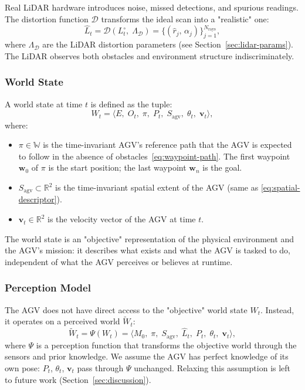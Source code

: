 \documentclass[conference]{IEEEtran}
\begin{document}
Real LiDAR hardware introduces noise, missed detections, and spurious readings. The distortion function $\mathcal{D}$ transforms the ideal scan into a "realistic" one:
\begin{equation}
\label{eq:distorted-scan}
     \hat{L}_t = \mathcal{D}(L_t^{\circ},\; \Lambda_{\mathcal{D}})
    = \{(\hat{r}_j,\, \alpha_j)\}_{j=1}^{N_{\text{rays}}},
\end{equation}
where $\Lambda_{\mathcal{D}}$ are the LiDAR distortion parameters (see Section~\ref{sec:lidar-params}). The LiDAR observes both obstacles and environment structure indiscriminately.
 
\subsubsection{World State}
\label{sec:world-state}
A world state at time $t$ is defined as the tuple:
\begin{equation}
\label{eq:world-state}
    W_t = \langle E,\; O_t,\; \pi,\;  P_t,\; S_{\text{agv}},\; \theta_t,\; \mathbf{v}_t \rangle,
\end{equation}
where:
\begin{itemize}
    \item $\pi \in \mathbb{W}$ is the time-invariant AGV's reference path that the AGV is expected to follow in the absence of obstacles~\eqref{eq:waypoint-path}. The first waypoint $\mathbf{w}_0$ of $\pi$ is the start position; the last waypoint $\mathbf{w}_n$ is the goal.
    \item $S_{\text{agv}} \subset \mathbb{R}^2$ is the time-invariant spatial extent of the AGV (same as \eqref{eq:spatial-descriptor}).
    \item $\mathbf{v}_t \in \mathbb{R}^2$ is the velocity vector of the AGV at time $t$.
\end{itemize}
The world state is an "objective" representation of the physical environment and the AGV's mission: it describes what exists and what the AGV is tasked to do, independent of what the AGV perceives or believes at runtime.
  
  
\subsubsection{Perception Model}
\label{sec:perception-model}
The AGV does not have direct access to the "objective" world state $W_t$. Instead, it operates on a perceived world $\tilde{W}_t$:
\begin{equation}
\label{eq:perception-function}
    \tilde{W}_t = \Psi(W_t)
    = \langle M_0,\; \pi,\; S_{\text{agv}},\; \hat{L}_t,\; P_t,\; \theta_t,\; \mathbf{v}_t \rangle,
\end{equation}
where $\Psi$ is a perception function that transforms the objective world through the sensors and prior knowledge. We assume the AGV has perfect knowledge of its own pose: $P_t$, $\theta_t$, $\mathbf{v}_t$ pass through $\Psi$ unchanged. Relaxing this assumption is left to future work (Section~\ref{sec:discussion}).
 
\end{document}
